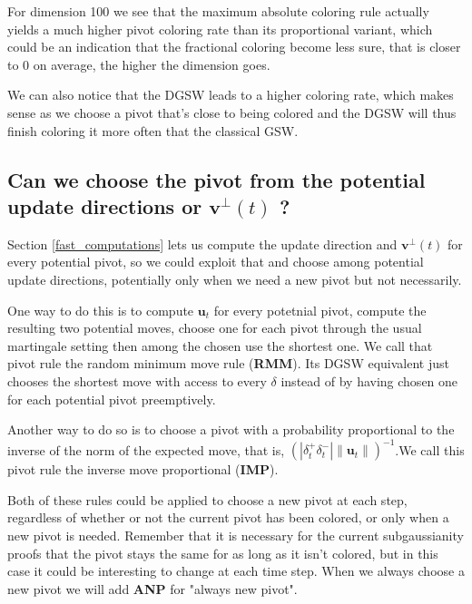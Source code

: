 \documentclass[12pt]{article}
\begin{document}
For dimension 100 we see that the maximum absolute coloring rule actually yields a much higher pivot coloring rate than its proportional variant, which could be an indication that the fractional coloring become less sure, that is closer to 0 on average, the higher the dimension goes.

We can also notice that the DGSW leads to a higher coloring rate, which makes sense as we choose a pivot that's close to being colored and the DGSW will thus finish coloring it more often that the classical GSW.

\subsection{Can we choose the pivot from the potential update directions or $\textbf{v}^\perp(t)$ ?}\label{pivot_from_v_perp}
Section \ref{fast_computations} lets us compute the update direction and $\textbf{v}^\perp(t)$ for every potential pivot, so we could exploit that and choose among potential update directions, potentially only when we need a new pivot but not necessarily. 

One way to do this is to compute $\textbf{u}_t$ for every potetnial pivot, compute the resulting two potential moves, choose one for each pivot through the usual martingale setting then among the chosen use the shortest one. We call that pivot rule the random minimum move rule (\textbf{RMM}). Its DGSW equivalent just chooses the shortest move with access to every $\delta$ instead of by having chosen one for each potential pivot preemptively. 

Another way to do so is to choose a pivot with a probability proportional to the inverse of the norm of the expected move, that is, $(|\delta_t^+\delta_t^-|\|\textbf{u}_t\|)^{-1}$.We call this pivot rule the inverse move proportional (\textbf{IMP}).

Both of these rules could be applied to choose a new pivot at each step, regardless of whether or not the current pivot has been colored, or only when a new pivot is needed. Remember that it is necessary for the current subgaussianity proofs that the pivot stays the same for as long as it isn't colored, but in this case it could be interesting to change at each time step. When we always choose a new pivot we will add \textbf{ANP} for "always new pivot".
\end{document}
